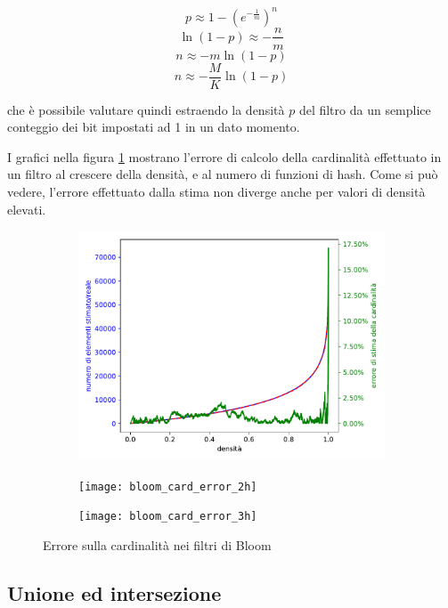 $$ p \approx 1-(e^{-\frac{1}{m}})^n $$
$$ \ln(1-p) \approx -\frac{n}{m} $$
$$ n \approx -m\ln(1-p) $$
$$ n \approx -\frac{M}{K}\ln(1-p) $$

che è possibile valutare quindi estraendo la densità $p$ del filtro da un semplice conteggio
dei bit impostati ad 1 in un dato momento.

I grafici nella figura \ref{fig:bloomerror} mostrano l'errore di calcolo della cardinalità
effettuato in un filtro al crescere della densità, e al numero di funzioni di hash. Come si può
vedere, l'errore effettuato dalla stima non diverge anche per valori di densità elevati.

\begin{figure}
	\centering

	\begin{subfigure}[t]{280pt}
	\centering\includegraphics[width=280pt]{../img/bloom_card_error_1h}
	\end{subfigure}

	\begin{subfigure}[t]{280pt}
	\centering\texttt{[image: bloom\_card\_error\_2h]}
	\end{subfigure}

	\begin{subfigure}[t]{280pt}
	\centering\texttt{[image: bloom\_card\_error\_3h]}
	\end{subfigure}

	\caption{Errore sulla cardinalità nei filtri di Bloom}
	\label{fig:bloomerror}
\end{figure}

\subsection{Unione ed intersezione}

